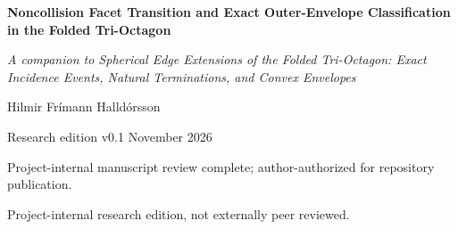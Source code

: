 \documentclass[11pt,a4paper]{article}
\theoremstyle{definition}
\begin{document}
\thispagestyle{plain}
{\LARGE\bfseries\color{ink}Noncollision Facet Transition and Exact Outer-Envelope Classification in the Folded Tri-Octagon\par}
\vspace{6pt}
{\small\itshape A companion to Spherical Edge Extensions of the Folded Tri-Octagon: Exact Incidence Events, Natural Terminations, and Convex Envelopes\par}
\vspace{7pt}
{\large Hilmir Frímann Halldórsson}\par
Research edition v0.1  November 2026\par
\vspace{3pt}
{\footnotesize Project-internal manuscript review complete; author-authorized for repository publication.\par
Project-internal research edition, not externally peer reviewed.}
\begin{abstract}
The existing folded Tri-Octagon determines 21 supporting lines and 42 signed exits on a concentric observer sphere. We study their explicitly declared convex envelope across the closed interval from Crossing A to Crossing B. The accepted coincidence catalogue fixes the endpoint mergers but does not determine all intervening supporting faces. There is exactly one interior change of the labelled maximal-face lattice: at midpoint-to-exit distance $t=3h$, all 42 vertices remain distinct while six symmetry-related face patches become maximal hexagons. The two open chambers have 56 and 50 facets, and the transition has 44. Each affected patch changes from two triangles and a quadrilateral to one hexagon, then to two quadrilaterals. Exact supporting-plane and polygon-side signs hold throughout each chamber; closure under true ridge adjacency proves that no facet or interior combinatorial transition is omitted. The limiting polygons recover the inherited A/B hulls. The complete closed-interval list has no ten-vertex maximal facet. These are consequences of the fixed exit family and convexification convention, without selecting a physical boundary, preferred observer radius, or dynamical law.
\end{abstract}
\end{document}
